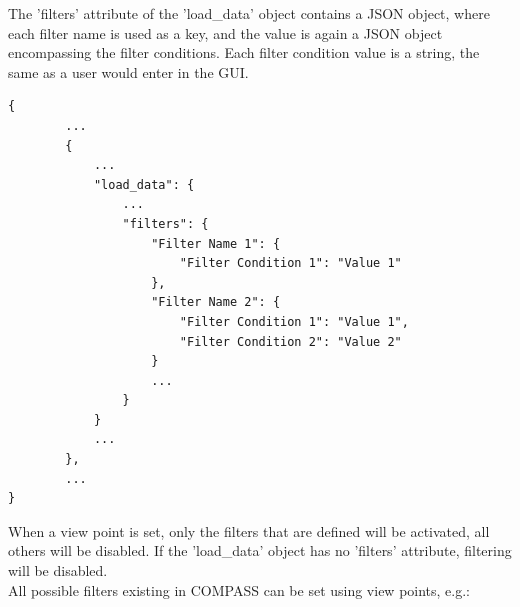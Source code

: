 The 'filters' attribute of the 'load\_data' object contains a JSON object, where each filter name is used as a key, and the value is again a JSON object encompassing the filter conditions. Each filter condition value is a string, the same as a user would enter in the GUI.

\begin{lstlisting}[basicstyle=\small\ttfamily]
{
        ...
        {
            ...
            "load_data": {
                ...
                "filters": {
                    "Filter Name 1": {
                        "Filter Condition 1": "Value 1"
                    },
                    "Filter Name 2": {
                        "Filter Condition 1": "Value 1",
                        "Filter Condition 2": "Value 2"
                    }
                    ...
                }
            }
            ...
        },
        ...
}
\end{lstlisting}      

When a view point is set, only the filters that are defined will be activated, all others will be disabled. If the 'load\_data' object has no 'filters' attribute, filtering will be disabled. \\

All possible filters existing in COMPASS can be set using view points, e.g.:

